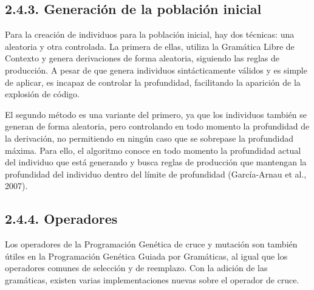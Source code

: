 \documentclass[spanish,a4paper,12pt,twoside]{report}
\begin{document}
    \subsection*{\large 2.4.3. Generación de la población inicial}
    Para la creación de individuos para la población inicial, hay dos técnicas: una aleatoria y otra controlada. La primera de ellas, utiliza la Gramática Libre de Contexto y genera derivaciones de forma aleatoria, siguiendo las reglas de producción. A pesar de que genera individuos sintácticamente válidos y es simple de aplicar, es incapaz de controlar la profundidad, facilitando la aparición de la explosión de código. \par
    El segundo método es una variante del primero, ya que los individuos también se generan de forma aleatoria, pero controlando en todo momento la profundidad de la derivación, no permitiendo en ningún caso que se sobrepase la profundidad máxima. Para ello, el algoritmo conoce en todo momento la profundidad actual del individuo que está generando y busca reglas de producción que mantengan la profundidad del individuo dentro del límite de profundidad (García-Arnau et al., 2007).
    
    \subsection*{\large 2.4.4. Operadores}
    Los operadores de la Programación Genética de cruce y mutación son también útiles en la Programación Genética Guiada por Gramáticas, al igual que los operadores comunes de selección y de reemplazo. Con la adición de las gramáticas, existen varias implementaciones nuevas sobre el operador de cruce.
    
      \vspace{-0.5cm}
\end{document}
